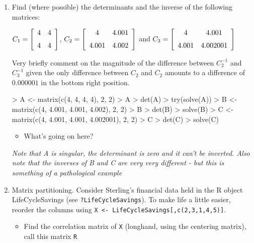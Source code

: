 \begin{enumerate}

\item Find (where possible) the determinants and the inverse of the following matrices:

$C_{1} = \left[ \begin {array}{cc} 4& 4\\\noalign{\medskip} 4& 4\end {array} \right]$, $C_{2} = \left[ \begin {array}{cc} 4& 4.001\\\noalign{\medskip} 4.001& 4.002\end {array} \right]$ and $C_{3} = \left[ \begin {array}{cc} 4& 4.001\\\noalign{\medskip} 4.001& 4.002001\end {array} \right] $

Very briefly comment on the magnitude of the difference between $C_{2}^{-1}$ and  $C_{3}^{-1}$ given the only difference between $C_{2}$ and $C_{2}$ amounts to a difference of $0.000001$ in the bottom right position.

\begin{Schunk}
\begin{Sinput}
> A <- matrix(c(4, 4, 4, 4), 2, 2)
> A
> det(A)
> try(solve(A))
> B <- matrix(c(4, 4.001, 4.001, 4.002), 2, 2)
> B
> det(B)
> solve(B)
> C <- matrix(c(4, 4.001, 4.001, 4.002001), 2, 2)
> C
> det(C)
> solve(C)
\end{Sinput}
\end{Schunk}


\begin{itemize}
  \item What's going on here?
\end{itemize}

\textit{Note that A is singular, the determinant is zero and it can't be inverted.   Also note that the inverses of B and C are very very different - but this is something of a pathological example}


\item Matrix partitioning.   Consider Sterling's financial data held in the R object LifeCycleSavings (see \verb+?LifeCycleSavings+).   To make life a little easier, reorder the columns using \texttt{X <- LifeCycleSavings[,c(2,3,1,4,5)]}.
  

\begin{itemize}
\item Find the correlation matrix of \texttt{X} (longhand, using the centering matrix), call this matrix \texttt{R}



\end{itemize}
\end{enumerate}
